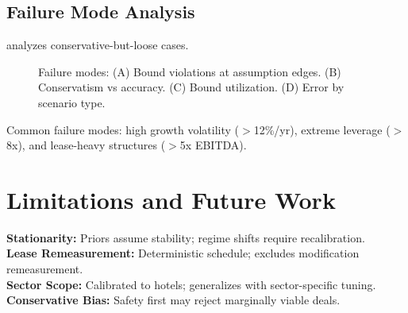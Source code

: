 \documentclass[11pt,a4paper]{article}
\numberwithin{equation}{section}
\theoremstyle{plain}
\theoremstyle{definition}
\begin{document}
\subsection{Failure Mode Analysis}

 analyzes conservative-but-loose cases.

\begin{figure}[h]
\centering
{}
\caption{Failure modes: (A) Bound violations at assumption edges. (B) Conservatism vs accuracy. (C) Bound utilization. (D) Error by scenario type.}
\label{fig:failure_modes}
\end{figure}

Common failure modes: high growth volatility ($>$12\%/yr), extreme leverage ($>$8x), and lease-heavy structures ($>$5x EBITDA).

\section{Limitations and Future Work}

\textbf{Stationarity:} Priors assume stability; regime shifts require recalibration. \\
\textbf{Lease Remeasurement:} Deterministic schedule; excludes modification remeasurement. \\
\textbf{Sector Scope:} Calibrated to hotels; generalizes with sector-specific tuning. \\
\textbf{Conservative Bias:} Safety first may reject marginally viable deals.
\end{document}
